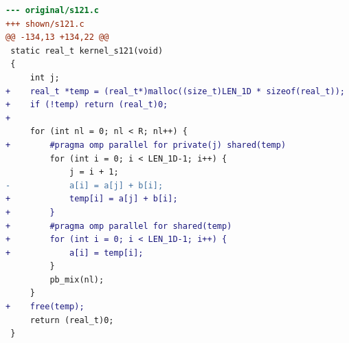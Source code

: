 \begin{lstlisting}[language=diff,basicstyle=\ttfamily\scriptsize,breaklines=true,caption={tsvc/s121 — no-change (e1_r_a) — shown: the program the agent built, then dropped (never shipped)}]
--- original/s121.c
+++ shown/s121.c
@@ -134,13 +134,22 @@
 static real_t kernel_s121(void)
 {
     int j;
+    real_t *temp = (real_t*)malloc((size_t)LEN_1D * sizeof(real_t));
+    if (!temp) return (real_t)0;
+
     for (int nl = 0; nl < R; nl++) {
+        #pragma omp parallel for private(j) shared(temp) 
         for (int i = 0; i < LEN_1D-1; i++) {
             j = i + 1;
-            a[i] = a[j] + b[i];
+            temp[i] = a[j] + b[i];
+        }
+        #pragma omp parallel for shared(temp) 
+        for (int i = 0; i < LEN_1D-1; i++) {
+            a[i] = temp[i];
         }
         pb_mix(nl);
     }
+    free(temp);
     return (real_t)0;
 }
 
\end{lstlisting}
